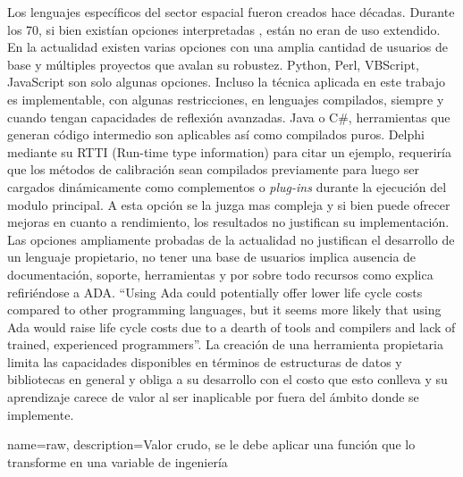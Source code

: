 \documentclass[twoside,twocolumn]{article}
\begin{document}
Los lenguajes específicos del sector espacial fueron creados hace décadas. Durante los 70, si bien existían opciones interpretadas , están no eran de uso extendido. En la actualidad existen varias opciones con una amplia cantidad de usuarios de base y múltiples proyectos que avalan su robustez. Python, Perl, VBScript, JavaScript son solo algunas opciones. Incluso la técnica aplicada en este trabajo es implementable, con algunas restricciones, en lenguajes compilados, siempre y cuando tengan capacidades de reflexión avanzadas. Java o C\#, herramientas que generan código intermedio son aplicables así como compilados puros. Delphi mediante su RTTI (Run-time type information) para citar un ejemplo, requeriría que los métodos de calibración sean compilados previamente para luego ser cargados dinámicamente como complementos o \textit{plug-ins} durante la ejecución del modulo principal. A esta opción se la juzga mas compleja y si bien puede ofrecer mejoras en cuanto a rendimiento, los resultados no justifican su implementación. 
Las opciones ampliamente probadas de la actualidad no justifican el desarrollo de un lenguaje propietario, no tener una base de usuarios implica ausencia de documentación, soporte, herramientas y por sobre todo recursos como explica \cite{smith2003ada} refiriéndose a ADA. ``Using Ada could potentially offer lower life cycle costs compared to other programming languages, but it seems more likely that using Ada would raise life cycle costs due to a
dearth of tools and compilers and lack of trained, experienced programmers''. La creación de una herramienta propietaria limita las capacidades disponibles en términos de estructuras de datos y bibliotecas en general y obliga a su desarrollo con el costo que esto conlleva y su aprendizaje carece de valor al ser inaplicable por fuera del ámbito donde se implemente. 




{
  name=raw,
  description={Valor crudo, se le debe aplicar una función que lo transforme en una variable de ingeniería}
}
\end{document}
